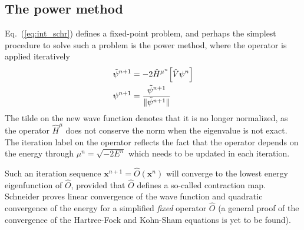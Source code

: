 \subsection{The power method}
Eq.~(\ref{eq:int_schr}) defines a fixed-point problem, and perhaps the simplest procedure to solve 
such a problem is the power method, where the operator is applied iteratively
\begin{align}
    \label{eq:power}
    \tilde{\psi}^{n+1} &= -2 \hat{H}^{\mu^n}\Big[\hat{V}\psi^n\Big]\\
    \psi^{n+1} &= \frac{\tilde{\psi}^{n+1}}{\|\tilde{\psi}^{n+1}\|}
\end{align}
The tilde on the new wave function denotes that it is no longer normalized, 
as the operator $\hat{H}^{\mu}$ does not conserve the norm when the eigenvalue 
is not exact\cite{Kalos:1962}. The iteration label on the operator reflects the 
fact that the operator depends on the energy through $\mu^n = \sqrt{-2E^n}$ 
which needs to be updated in each iteration.

Such an iteration sequence $\boldsymbol{x}^{n+1} = \hat{O}(\boldsymbol{x}^n)$ will converge to 
the lowest energy eigenfunction of $\hat{O}$, provided that $\hat{O}$ defines a so-called 
contraction map. Schneider \etal\cite{Schneider:2008} proves linear convergence of the wave function 
and quadratic convergence of the energy for a simplified \emph{fixed} operator $\hat{O}$ (a 
general proof of the convergence of the Hartree-Fock and Kohn-Sham equations is yet to be found). 

